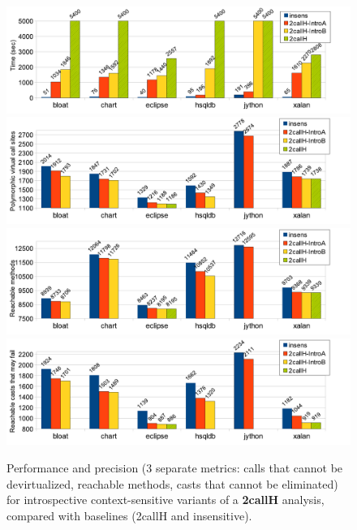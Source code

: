 \begin{figure}[t!bp]
\begin{center}
\includegraphics[scale=0.54]{assets/introspective/2callHtime.pdf} \\
\includegraphics[scale=0.54]{assets/introspective/2callHvcalls.pdf} \\
\includegraphics[scale=0.54]{assets/introspective/2callHmeths.pdf} \\
\includegraphics[scale=0.54]{assets/introspective/2callHcasts.pdf}
\end{center}
\caption{Performance and precision (3 separate metrics: calls that cannot be devirtualized, reachable methods, casts that cannot be eliminated) for introspective context-sensitive variants of a \textbf{2callH} analysis, compared with baselines (2callH and insensitive).}
\label{fig:introspect:2callH-chart}
\end{figure}


